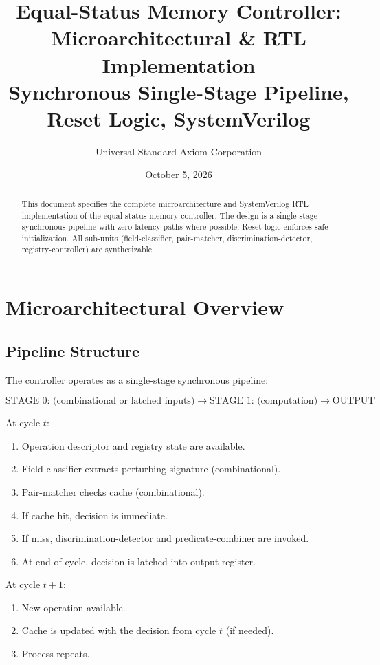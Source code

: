 \documentclass[11pt,oneside]{article}
\title{Equal-Status Memory Controller: Microarchitectural \& RTL Implementation\\
\large Synchronous Single-Stage Pipeline, Reset Logic, SystemVerilog}
\author{Universal Standard Axiom Corporation}
\date{October 5, 2026}
\begin{document}
\maketitle

\begin{abstract}
This document specifies the complete microarchitecture and SystemVerilog RTL implementation of the equal-status memory controller. The design is a single-stage synchronous pipeline with zero latency paths where possible. Reset logic enforces safe initialization. All sub-units (field-classifier, pair-matcher, discrimination-detector, registry-controller) are synthesizable.
\end{abstract}

\tableofcontents
\newpage

\section{Microarchitectural Overview}

\subsection{Pipeline Structure}

The controller operates as a single-stage synchronous pipeline:

\[
\text{STAGE 0: (combinational or latched inputs)} \to \text{STAGE 1: (computation)} \to \text{OUTPUT}
\]

At cycle $t$:
\begin{enumerate}
\item Operation descriptor and registry state are available.
\item Field-classifier extracts perturbing signature (combinational).
\item Pair-matcher checks cache (combinational).
\item If cache hit, decision is immediate.
\item If miss, discrimination-detector and predicate-combiner are invoked.
\item At end of cycle, decision is latched into output register.
\end{enumerate}

At cycle $t+1$:
\begin{enumerate}
\item New operation available.
\item Cache is updated with the decision from cycle $t$ (if needed).
\item Process repeats.
\end{enumerate}
\end{document}
